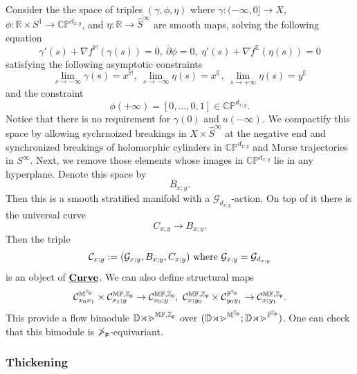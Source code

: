 \documentclass[reqno, 10pt]{amsart}
\numberwithin{equation}{section}
\numberwithin{equation}{section}
\theoremstyle{definition}
\theoremstyle{remark}
\newcommand{\beqn}{\begin{equation*}}
\newcommand{\eeqn}{\end{equation*}}
\newcommand{\ov}{\overline}
\newcommand{\mb}{\mathbb}
\newcommand{\mc}{\mathcal}
\newcommand{\p}{{\sf p}}
\newcommand{\zp}{{{\mb Z}_{\sf p}}}
\newcommand{\ep}{{{\mathbb E}}}
\newcommand{\wh}{\widehat}
\newcommand{\uds}[1]{\underline{\smash{#1}}}
\begin{document}
Consider the the space of triples $(\gamma, \phi, \eta)$ where $\gamma: (-\infty, 0] \to X$, $\phi: {\mb R}\times S^1 \to \mb{CP}^{d_{x;y}}$, and $\eta: {\mb R} \to \wh S^\infty$ are smooth maps, solving the following equation
\beqn
\gamma'(s)  + \nabla f^{\mb M}(\gamma(s)) = 0,\ \ov\partial \phi = 0,\ \eta'(s) + \nabla f^\ep( \eta (s)) = 0
\eeqn
satisfying the following asymptotic constraints
\beqn
\lim_{s \to -\infty} \gamma(s) = x^{\mb M},\ \lim_{s \to -\infty} \eta(s) = x^\ep,\ \lim_{ s\to +\infty} \eta(s) = y^\ep
\eeqn
and the constraint
\beqn
\phi (+\infty) = [0, \ldots, 0, 1] \in \mb{CP}^{d_{x; y}}.
\eeqn
Notice that there is no requirement for $\gamma(0)$ and $u(-\infty)$. We compactify this space by allowing sychrnoized breakings in $X \times \wh S^\infty$ at the negative end and synchronized breakings of holomorphic cylinders in $\mb{CP}^{d_{x;y}}$ and Morse trajectories in $S^\infty$. Next, we remove those elements whose images in $\mb{CP}^{d_{x;y}}$ lie in any hyperplane. Denote this space by 
\beqn
B_{x; y}.
\eeqn
Then this is a smooth stratified manifold with a ${\mc G}_{d_{x;y}}$-action. On top of it there is the universal curve
\beqn
C_{x; y} \to B_{x;y}.
\eeqn
Then the triple 
\beqn
{\mc C}_{x;y}:= ( {\mc G}_{x;y}, B_{x;y}, C_{x;y})\ {\rm where}\ {\mc G}_{x;y} = {\mc G}_{d_{x;y}}
\eeqn
is an object of $\uds{\bf Curve}$. We can also define structural maps
\beqn
{\mc C}_{x_0 x_1}^{{\mb M}^\zp} \times {\mc C}_{x_1; y}^{\mb{MF}, \zp} \to {\mc C}_{x_0; y}^{\mb{MF}, \zp},\ {\mc C}_{x; y_0}^{\mb{MF},\zp} \times {\mc C}_{y_0 y_1}^{{\mb F}^\zp} \to {\mc C}_{x; y_1}^{\mb{MF}, \zp}.
\eeqn
This provide a flow bimodule  $\mb{Dom}^{\mb{MF}, \zp}$ over $(\mb{Dom}^{{\mb M}^\zp}; \mb{Dom}^{\mb{F}^\zp})$. One can check that this bimodule is $\mb\Pi_\p$-equivariant.


\subsubsection{Thickening}
\end{document}
